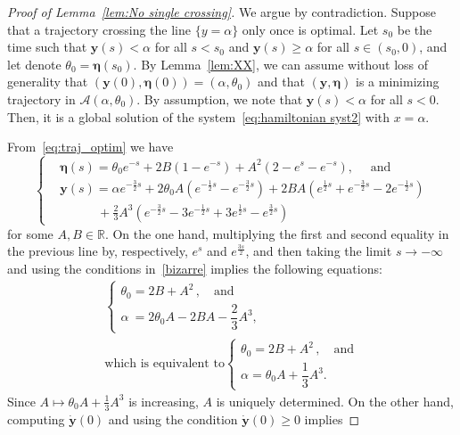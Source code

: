 \documentclass[10pt]{amsart}
\theoremstyle{definition}\newtheorem{defi}[theo]{Definition}\newtheorem{rema}[theo]{Remark}\newtheorem{exam}[theo]{Example}\newtheorem{exem}[theo]{Example}\newtheorem{nota}[theo]{Notation}
\newcommand{\R}{\mathbb{R}}
\newcommand{\by}{\mathbf{y}}
\newcommand{\bA}{\mathscr{A}}
\newcommand{\beeta}{\boldsymbol{\eta}}
\newcommand{\1}{\mathds{1}}
\begin{document}
\begin{proof}[Proof of Lemma~\ref{lem:No single crossing}]
We argue by contradiction. Suppose that a trajectory crossing the line $\{y = \alpha\}$ only once is optimal. Let $s_0$ be the time such that $\by(s) < \alpha$ for all $s < s_0$ and $\by(s) \geq \alpha$ for all $s\in(s_0,0)$, and let denote $\theta_0 = \beeta(s_0)$. By Lemma~\ref{lem:XX}, we can assume without loss of generality that $(\by(0),\beeta(0)) = (\alpha,\theta_0)$ and that $(\by,\beeta)$ is a minimizing trajectory in $\bA(\alpha,\theta_0)$. By assumption, we note that $\by(s) < \alpha$ for all $s < 0$. Then, it is a global solution of the system~\eqref{eq:hamiltonian syst2} with $x = \alpha$.

From~\eqref{eq:traj_optim} we have
\begin{equation*}
\begin{cases}
&\beeta(s) = \theta_0 e^{-s} + 2 B \left(1 - e^{-s}\right) + A ^2 \left(2 - e^{s} - e^{-s}\right), \quad\text{ and}
\\[0.10em]
&\by(s) = \alpha e^{-\frac32s} + 2 \theta_0 A \left(e^{-\frac12 s } - e^{-\frac32s}\right) + 2 B A \left(e^{\frac12 s } + e^{-\frac32s} - 2 e^{-\frac12s} \right)
\\[0.10em]
&\displaystyle\qquad\quad + \frac23 A^3 \left(e^{-\frac32s} - 3e^{-\frac12s} + 3e^{\frac12s} - e^{\frac32s} \right)
\end{cases}
\end{equation*}
for some $A, B \in \R$. On the one hand, multiplying the first and second equality in the previous line by, respectively, $e^{s}$ and $e^{\frac{3s}{2}}$, and then taking the limit $s\rightarrow -\infty$ and using the conditions in~\eqref{bizarre} implies the following equations:
\begin{multline}\label{eq:condition at oo lem 3.2}
\begin{cases}
\theta_0 = 2B + A^2\,, \quad \text{and}
\\[0.10em]
\alpha \:= 2\theta_0 A - 2BA - \dfrac23A^3,
\end{cases} \\
\text{which is equivalent to}
\begin{cases}
\theta_0 = 2B + A^2\,, \quad \text{and}
\\[0.10em]
\alpha = \theta_0 A+ \dfrac13A^3.
\end{cases}
\end{multline}
Since $A\mapsto \theta_0 A+ \frac13A^3$ is increasing, $A$ is uniquely determined. On the other hand, computing $\dot{\by}(0)$ and using the condition $\dot{\by} (0)\geq 0$ implies

\end{proof}
\end{document}
